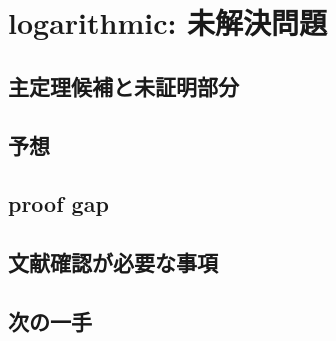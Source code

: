
\section{logarithmic: 未解決問題}

\subsection{主定理候補と未証明部分}

\subsection{予想}

\subsection{proof gap}

\subsection{文献確認が必要な事項}

\subsection{次の一手}
